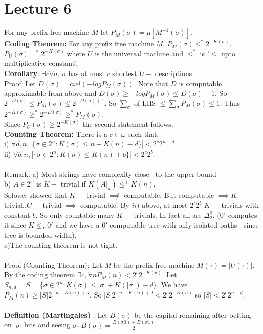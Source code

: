 \documentclass{article}
\begin{document}
	\section{Lecture 6}
	For any prefix free machine $M$ let $P_M(\sigma) = \mu[M^{-1}(\sigma)]$.\\
	\textbf{Coding Theorem:} For any prefix free machine $M$, $P_M(\sigma) \leq^* 2^{-K(\sigma)}$.\\
	$P_U(\sigma) =^* 2^{-K(\sigma)}$ where $U$ is the universal machine and $\leq^*$ is '$\leq$ upto multiplicative constant'. \\
	\textbf{Corollary}: $\exists c \forall \sigma$, $\sigma$ has at most $c$ shortest $U-$ descriptions.\\
	Proof: Let $D(\sigma) = ciel(-log P_M(\sigma))$. Note that $D$ is computable approximable from above and $D(\sigma) \geq -log P_M(\sigma) \leq D(\sigma)-1$. So $2^{-D(\sigma)} \leq P_M(\sigma) \leq 2^{-D(\sigma)+1}$.
	So $\sum_\sigma $ of LHS $\leq \sum_\sigma P_M(\sigma) \leq 1$. Thus $2^{-K(\sigma)} \geq^* 2^{-D(\sigma)} \geq^* P_M(\sigma)$.\\
	Since $P_U(\sigma) \geq 2^{-K(\sigma)}$ the second statement follows.\\
	\textbf{Counting Theorem:} There is a $c\in \omega$ such that:\\
	i) $\forall d,n, |\{ \sigma \in 2^n : K(\sigma) \leq n+K(n) -d\}| < 2^c 2^{n-d}$.\\
	ii) $\forall b,n, |\{ \sigma \in 2^n : K(\sigma) \leq K(n) +b\}| < 2^c 2^{b}$.\\
	\\
	Remark: a) Most strings have complexity close$^+$ to the upper bound\\
b) $A \in 2^\omega$ is $K-$ trivial if $K(A|_n) \leq^+ K(n)$.\\ Solovay showed that $K-$ trivial $\not \implies $ computable. But computable $\implies K-$ trivial..$C-$ trivial $\implies$ computable. By $ii)$ above, at most $2^c 2^b$ $ K-$ trivials with constant $b$. So only countable many $K-$ trivials. In fact all are $\Delta^0_2$. ($0'$ computes it since $K \leq_T 0'$ and we have a $0'$ computable tree with only isolated paths - since tree is bounded width).\\
c)The counting theorem is not tight.\\
\\
Proof (Counting Theorem): Let $M$ be the prefix free machine $M(\tau) = |U(\tau)|$.
By the coding theorem $\exists c, \forall n P_M(n) <2^c 2^{-K(n)}$. Let $S_{n,d} = S = \{\sigma \in 2^n: K(\sigma) \leq |\sigma| + K(|\sigma|) - d\}$. We have $P_M(n) \geq |S| 2^{-n-K(n)+d}$. So $|S| 2^{-n-K(n)+d} < 2^c 2^{-K(n)}$ so $|S| < 2^c 2^{n-d}$.\\
\\
\textbf{Definition (Martingales)} : Let $B(\sigma)$ be the capital remaining after betting on $|\sigma|$ bits and seeing $\sigma$. $B(\sigma) =\frac{ B(\sigma0)+ B(\sigma1)}{2}$.
\newpage
\end{document}
